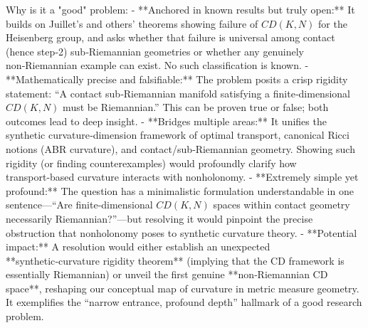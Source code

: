 Why is it a "good" problem:  
- **Anchored in known results but truly open:** It builds on Juillet’s and others’ theorems showing failure of \(CD(K,N)\) for the Heisenberg group, and asks whether that failure is universal among contact (hence step‑2) sub‑Riemannian geometries or whether any genuinely non‑Riemannian example can exist.  No such classification is known.  
- **Mathematically precise and falsifiable:** The problem posits a crisp rigidity statement: “A contact sub‑Riemannian manifold satisfying a finite‑dimensional \(CD(K,N)\) must be Riemannian.”  This can be proven true or false; both outcomes lead to deep insight.  
- **Bridges multiple areas:** It unifies the synthetic curvature‑dimension framework of optimal transport, canonical Ricci notions (ABR curvature), and contact/sub‑Riemannian geometry.  Showing such rigidity (or finding counterexamples) would profoundly clarify how transport‑based curvature interacts with nonholonomy.  
- **Extremely simple yet profound:** The question has a minimalistic formulation understandable in one sentence—“Are finite‑dimensional \(CD(K,N)\) spaces within contact geometry necessarily Riemannian?”—but resolving it would pinpoint the precise obstruction that nonholonomy poses to synthetic curvature theory.  
- **Potential impact:** A resolution would either establish an unexpected **synthetic‑curvature rigidity theorem** (implying that the CD framework is essentially Riemannian) or unveil the first genuine **non‑Riemannian CD space**, reshaping our conceptual map of curvature in metric measure geometry.  It exemplifies the “narrow entrance, profound depth” hallmark of a good research problem.